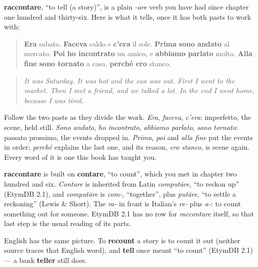 \begin{grammarlens}[title={Grammar Lens: the backbone of a told story}]
\textbf{raccontare}, \textquotedblleft{}to tell (a story)\textquotedblright{}, is a plain \emph{-are} verb you have had since chapter one hundred and thirty-six. Here is what it tells, once it has both pasts to work with:

\begin{quote}
\textbf{Era} sabato. \textbf{Faceva} caldo e \textbf{c'era} il sole. \textbf{Prima} \textbf{sono andato} al mercato. \textbf{Poi} \textbf{ho incontrato} un amico, e \textbf{abbiamo parlato} molto. \textbf{Alla fine} \textbf{sono tornato} a casa, \textbf{perché ero} stanco.
\end{quote}

\begin{quote}
\emph{It was Saturday. It was hot and the sun was out. First I went to the market. Then I met a friend, and we talked a lot. In the end I went home, because I was tired.}
\end{quote}

Follow the two pasts as they divide the work. \emph{Era}, \emph{faceva}, \emph{c'era}: imperfetto, the scene, held still. \emph{Sono andato}, \emph{ho incontrato}, \emph{abbiamo parlato}, \emph{sono tornato}: passato prossimo, the events dropped in. \emph{Prima}, \emph{poi} and \emph{alla fine} put the events in order; \emph{perché} explains the last one, and its reason, \emph{ero stanco}, is scene again. Every word of it is one this book has taught you.
\end{grammarlens}

\begin{cousinweb}
\textbf{raccontare} is built on \textbf{contare}, \textquotedblleft{}to count\textquotedblright{}, which you met in chapter two hundred and six. \emph{Contare} is inherited from Latin \emph{computāre}, \textquotedblleft{}to reckon up\textquotedblright{} (EtymDB 2.1), and \emph{computāre} is \emph{com-}, \textquotedblleft{}together\textquotedblright{}, plus \emph{putāre}, \textquotedblleft{}to settle a reckoning\textquotedblright{} (Lewis \& Short). The \emph{ra-} in front is Italian's \emph{re-} plus \emph{a-}: to count something out for someone. EtymDB 2.1 has no row for \emph{raccontare} itself, so that last step is the usual reading of its parts.

English has the same picture. To \textbf{recount} a story is to count it out (neither source traces that English word), and \textbf{tell} once meant \textquotedblleft{}to count\textquotedblright{} (EtymDB 2.1) — a bank \textbf{teller} still does.
\end{cousinweb}

